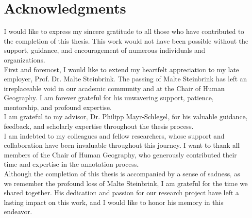 \chapter*{Acknowledgments}
I would like to express my sincere gratitude to all those who have contributed to the completion of this thesis. This work would not have been possible without the support, guidance, and encouragement of numerous individuals and organizations.\\
First and foremost, I would like to extend my heartfelt appreciation to my late employer, Prof. Dr. Malte Steinbrink. The passing of Malte Steinbrink has left an irreplaceable void in our academic community and at the Chair of Human Geography. I am forever grateful for his unwavering support, patience, mentorship, and profound expertise.\\
I am grateful to my advisor, Dr. Philipp Mayr-Schlegel, for his valuable guidance, feedback, and scholarly expertise throughout the thesis process.\\
I am indebted to my colleagues and fellow researchers, whose support and collaboration have been invaluable throughout this journey. I want to thank all members of the Chair of Human Geography, who generously contributed their time and expertise in the annotation process.\\
Although the completion of this thesis is accompanied by a sense of sadness, as we remember the profound loss of Malte Steinbrink, I am grateful for the time we shared together. His dedication and passion for our research project have left a lasting impact on this work, and I would like to honor his memory in this endeavor.